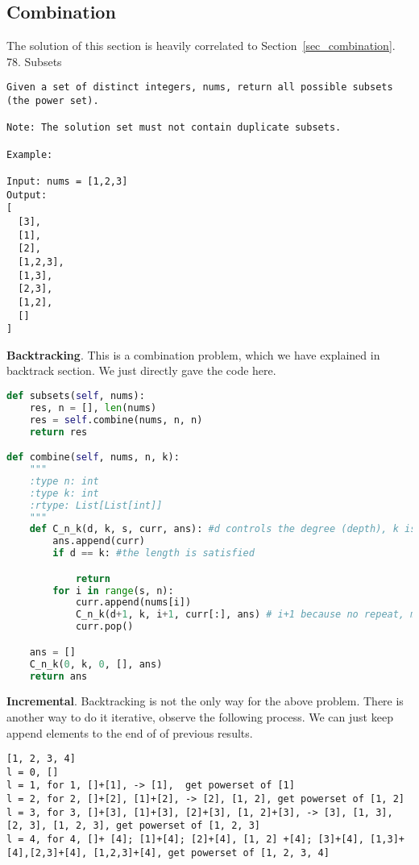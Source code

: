 \documentclass[../../question_3_array_question.tex]{subfiles}
\begin{document}
\subsection{Combination}
\label{part4_array_combine}
The solution of this section is heavily correlated to Section~\ref{sec_combination}. 
78. Subsets
\begin{lstlisting}
Given a set of distinct integers, nums, return all possible subsets (the power set).

Note: The solution set must not contain duplicate subsets.

Example:

Input: nums = [1,2,3]
Output:
[
  [3],
  [1],
  [2],
  [1,2,3],
  [1,3],
  [2,3],
  [1,2],
  []
]
\end{lstlisting}
\textbf{Backtracking}. This is a combination problem, which we have explained in backtrack section. We just directly gave the code here. 
\begin{lstlisting}[language = Python]
def subsets(self, nums):
    res, n = [], len(nums)
    res = self.combine(nums, n, n)
    return res

def combine(self, nums, n, k):
    """
    :type n: int
    :type k: int
    :rtype: List[List[int]]
    """
    def C_n_k(d, k, s, curr, ans): #d controls the degree (depth), k is controls the return level, curr saves the current result, ans is all the result
        ans.append(curr)
        if d == k: #the length is satisfied

            return
        for i in range(s, n):
            curr.append(nums[i])
            C_n_k(d+1, k, i+1, curr[:], ans) # i+1 because no repeat, make sure use deep copy curr[:]
            curr.pop()

    ans = []    
    C_n_k(0, k, 0, [], ans) 
    return ans
\end{lstlisting}
\textbf{Incremental}. Backtracking is not the only way for the above problem. There is another way to do it iterative, observe the following process. We can just keep append elements to the end of of previous results. 
\begin{lstlisting}
[1, 2, 3, 4]
l = 0, []
l = 1, for 1, []+[1], -> [1],  get powerset of [1]
l = 2, for 2, []+[2], [1]+[2], -> [2], [1, 2], get powerset of [1, 2]
l = 3, for 3, []+[3], [1]+[3], [2]+[3], [1, 2]+[3], -> [3], [1, 3], [2, 3], [1, 2, 3], get powerset of [1, 2, 3]
l = 4, for 4, []+ [4]; [1]+[4]; [2]+[4], [1, 2] +[4]; [3]+[4], [1,3]+[4],[2,3]+[4], [1,2,3]+[4], get powerset of [1, 2, 3, 4]
\end{lstlisting}
\end{document}
